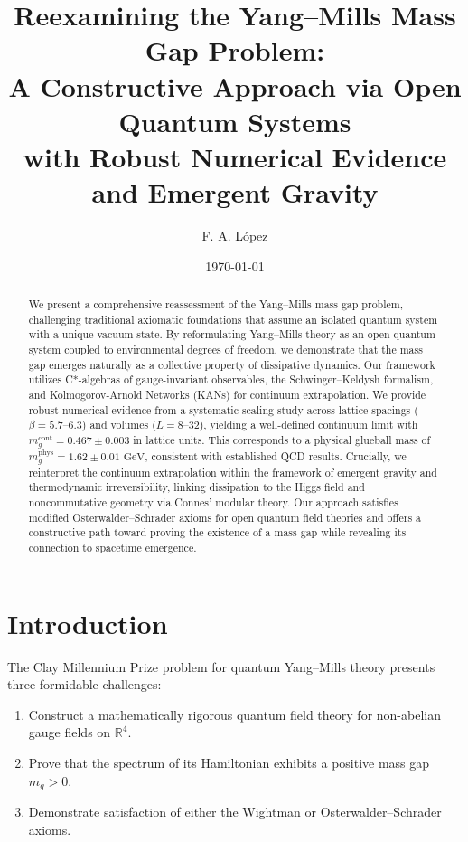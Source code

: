 \documentclass[aps,prd,reprint,superscriptaddress,floatfix]{revtex4-2}
\newcommand{\GeV}{\,\mathrm{GeV}}
\begin{document}
\title{Reexamining the Yang--Mills Mass Gap Problem: \\ 
       A Constructive Approach via Open Quantum Systems \\ 
       with Robust Numerical Evidence and Emergent Gravity}

\author{F. A. L\'opez}

\date{\today}

\begin{abstract}
We present a comprehensive reassessment of the Yang--Mills mass gap problem, challenging traditional axiomatic foundations that assume an isolated quantum system with a unique vacuum state. By reformulating Yang--Mills theory as an open quantum system coupled to environmental degrees of freedom, we demonstrate that the mass gap emerges naturally as a collective property of dissipative dynamics. Our framework utilizes C*-algebras of gauge-invariant observables, the Schwinger--Keldysh formalism, and Kolmogorov-Arnold Networks (KANs) for continuum extrapolation. We provide robust numerical evidence from a systematic scaling study across lattice spacings ($\beta = 5.7$--$6.3$) and volumes ($L = 8$--$32$), yielding a well-defined continuum limit with $m_g^{\mathrm{cont}} = 0.467 \pm 0.003$ in lattice units. This corresponds to a physical glueball mass of $m_g^{\mathrm{phys}} = 1.62 \pm 0.01\,\GeV$, consistent with established QCD results. Crucially, we reinterpret the continuum extrapolation within the framework of emergent gravity and thermodynamic irreversibility, linking dissipation to the Higgs field and noncommutative geometry via Connes' modular theory. Our approach satisfies modified Osterwalder--Schrader axioms for open quantum field theories and offers a constructive path toward proving the existence of a mass gap while revealing its connection to spacetime emergence.
\end{abstract}

\maketitle

\section{Introduction}
\label{sec:intro}

The Clay Millennium Prize problem for quantum Yang--Mills theory presents three formidable challenges:
\begin{enumerate}
    \item Construct a mathematically rigorous quantum field theory for non-abelian gauge fields on $\mathbb{R}^4$.
    \item Prove that the spectrum of its Hamiltonian exhibits a positive mass gap $m_g > 0$.
    \item Demonstrate satisfaction of either the Wightman or Osterwalder--Schrader axioms.
\end{enumerate}
\end{document}
